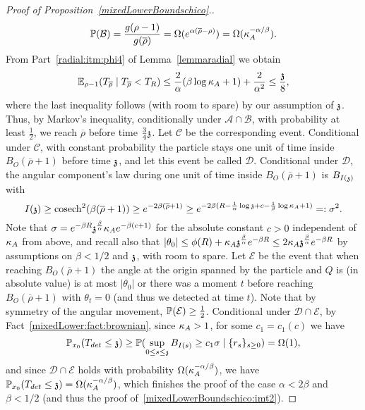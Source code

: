 \begin{proof}[Proof of Proposition~\ref{mixedLowerBoundschico}.]
$$
\PP(\mathcal{B})=\frac{g(\rho-1)}{g(\overline{\rho})}=\Omega(e^{\alpha(\overline{\rho}-\rho)})=
\Omega(\KA^{-\alpha/\beta}).%
$$
 From Part~\eqref{radial:itm:phi4} of Lemma~\ref{lemmaradial} we obtain 
$$
\EE_{\rho-1}(T_{\overline{\rho}} \mid T_{\overline{\rho}} < T_R) \le \frac{2}{\alpha}(\beta \log \KA+1)+\frac{2}{\alpha^2} \le \frac{\ss}{8},
$$
where the last inequality follows (with room to spare) by our assumption of $\ss$.
Thus, by Markov's inequality, conditionally under $\mathcal A \cap \mathcal B$,
with probability at least $\frac12$, we reach $\overline{\rho}$ before time $\frac34\ss$. Let $\mathcal C$ be the corresponding event. Conditional under $\mathcal C$, with constant probability the particle stays one unit of time inside $B_O(\overline{\rho}+1)$ before time $\ss$, and let this event be called $\mathcal D$. Conditional under $\mathcal D$, the angular component's law during one unit of time inside $B_O(\overline{\rho}+1)$ is $B_{\II{\ss}}$ with $$\II{\ss}\ge \cosech^2(\beta(\overline{\rho}+1)) \ge e^{-2\beta(\overline{\rho}+1)} \geq e^{-2\beta (R-\frac{1}{\alpha}\log\ss+c-\frac{1}{\beta}\log \KA +1)}=:\sigma^2.$$
Note that $\sigma = e^{-\beta R}\ss^{\frac{\beta}{\alpha}}\KA e^{-\beta(c+1)}$ for the absolute constant $c > 0$ independent of $\KA$ from above, and recall also that
 $|\theta_0| \le \phi(R)+\KA \ss^{\frac{\beta}{\alpha}}e^{-\beta R} \le 2\KA \ss^{\frac{\beta}{\alpha}}e^{-\beta R}$ by assumptions on $\beta < 1/2$ and $\ss$, with room to spare. 
Let $\mathcal{E}$ be the event that when reaching $B_O(\overline{\rho}+1)$ the angle at the origin spanned by the particle and $Q$ is (in absolute value) is at most $|\theta_0|$ or there was a moment $t$ before reaching $B_O(\overline{\rho}+1)$ with $\theta_t=0$ (and thus we detected at time $t$). Note that by symmetry of the angular movement, $\PP(\mathcal{E})\ge \frac12$.
 Conditional under $\mathcal{D} \cap \mathcal{E}$, by Fact~\ref{mixedLower:fact:brownian},  since $\KA > 1$, for some $c_1=c_1(c)$ we have
\[
\P_{x_0}(T_{det}\leq\ss)\geq \PP(\sup_{0\leq s\leq \ss} B_{\II{s}}\geq c_1 \sigma \mid \{r_s\}_{s\geq 0}) =\Omega(1),
\]
 and since $\mathcal{D} \cap \mathcal{E}$ holds with probability $\Omega(\KA^{-\alpha/\beta})$, we have
 $
\P_{x_0}(T_{det}\leq\ss)= \Omega(\KA^{-\alpha/\beta})$,
which finishes the proof of the case $\alpha < 2\beta$ and $\beta < 1/2$ (and thus the proof of~\eqref{mixedLowerBoundschico:imt2}).



\end{proof}
